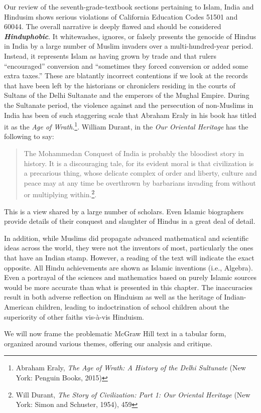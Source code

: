 Our review of the seventh-grade-textbook sections pertaining to Islam, India and Hindusim shows serious violations of California Education Codes 51501 and 60044. The overall narrative is deeply flawed and should be considered \textit{\textbf{Hinduphobic}}. It whitewashes, ignores, or falsely presents the genocide of Hindus in India by a large number of Muslim invaders over a multi-hundred-year period. Instead, it represents Islam as having grown by trade and that rulers “encouraged” conversion and “sometimes they forced conversion or added some extra taxes.” These are blatantly incorrect contentions if we look at the records that have been left by the historians or chroniclers residing in the courts of Sultans of the Delhi Sultanate and the emperors of the Mughal Empire. During the Sultanate period, the violence against and the persecution of non-Muslims in India has been of such staggering scale that Abraham Eraly in his book has titled it as the \textit{Age of Wrath}.\footnote{Abraham Eraly, \textit{The Age of Wrath: A History of the Delhi Sultunate} (New York: Penguin Books, 2015)}. William Durant, in the \textit{Our Oriental Heritage}  has the following to say:
\vskip -15pt

\begin{quote}
The Mohammedan Conquest of India is probably the bloodiest story in history. It is a discouraging tale, for its evident moral is that civilization is a precarious thing, whose delicate complex of order and liberty, culture and peace may at any time be overthrown by barbarians invading from without or multiplying within.\footnote{Will Durant, \textit{The Story of Civilization: Part 1: Our Oriental Heritage} (New York: Simon and Schuster, 1954), 459}.  
\end{quote}
\vskip -8pt
This is a view shared by a large number of scholars. Even Islamic biographers provide details of their conquest and slaughter of Hindus in a great deal of detail.  

In addition, while Muslims did propagate advanced mathematical and scientific ideas across the world, they were not the inventors of most, particularly the ones that have an Indian stamp. However, a reading of the text will indicate the exact opposite. All Hindu achievements are shown as Islamic inventions (i.e., Algebra). Even a portrayal of the sciences and mathematics based on purely Islamic sources would be more accurate than what is presented in this chapter. The inaccuracies result in both adverse reflection on Hinduism as well as the heritage of Indian-American children, leading to indoctrination of school children about the superiority of other faiths vis-à-vis Hinduism.

We will now frame the problematic McGraw Hill text in a tabular form, organized around various themes, offering our analysis and critique.  

